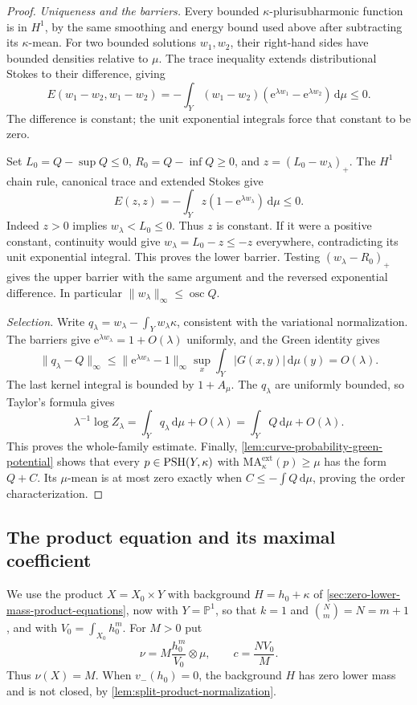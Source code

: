 \begin{proof}
\emph{Uniqueness and the barriers.} Every bounded $\kappa$-plurisubharmonic function is in $H^1$, by the same smoothing and energy bound used above after subtracting its $\kappa$-mean. For two bounded solutions $w_1,w_2$, their right-hand sides have bounded densities relative to $\mu$. The trace inequality extends distributional Stokes to their difference, giving
\[
 E(w_1-w_2,w_1-w_2)
 =-\int_Y(w_1-w_2)(\mathrm e^{\lambda w_1}-\mathrm e^{\lambda w_2})\,\mathrm d\mu\leq0.
\]
The difference is constant; the unit exponential integrals force that constant to be zero.

Set $L_0=Q-\sup Q\leq0$, $R_0=Q-\inf Q\geq0$, and $z=(L_0-w_\lambda)_+$. The $H^1$ chain rule, canonical trace and extended Stokes give
\[
 E(z,z)=-\int_Yz(1-\mathrm e^{\lambda w_\lambda})\,\mathrm d\mu\leq0.
\]
Indeed $z>0$ implies $w_\lambda<L_0\leq0$. Thus $z$ is constant. If it were a positive constant, continuity would give $w_\lambda=L_0-z\leq-z$ everywhere, contradicting its unit exponential integral. This proves the lower barrier. Testing $(w_\lambda-R_0)_+$ gives the upper barrier with the same argument and the reversed exponential difference. In particular $\|w_\lambda\|_\infty\leq\operatorname{osc}Q$.

\emph{Selection.} Write $q_\lambda=w_\lambda-\int_Yw_\lambda\kappa$, consistent with the variational normalization. The barriers give $\mathrm e^{\lambda w_\lambda}=1+O(\lambda)$ uniformly, and the Green identity gives
\[
 \|q_\lambda-Q\|_\infty
 \leq\|\mathrm e^{\lambda w_\lambda}-1\|_\infty
       \sup_x\int_Y|G(x,y)|\,\mathrm d\mu(y)=O(\lambda).
\]
The last kernel integral is bounded by $1+A_\mu$. The $q_\lambda$ are uniformly bounded, so Taylor's formula gives
\[
 \lambda^{-1}\log Z_\lambda
 =\int_Yq_\lambda\,\mathrm d\mu+O(\lambda)
 =\int_YQ\,\mathrm d\mu+O(\lambda).
\]
This proves the whole-family estimate. Finally, \cref{lem:curve-probability-green-potential} shows that every $p\in\mathrm{PSH}(Y,\kappa)$ with $\mathrm{MA}^{\mathrm{ext}}_\kappa(p)\geq\mu$ has the form $Q+C$. Its $\mu$-mean is at most zero exactly when $C\leq-\int Q\,\mathrm d\mu$, proving the order characterization.
\end{proof}

\subsection{The product equation and its maximal coefficient}

We use the product $X=X_0\times Y$ with background $H=h_0+\kappa$ of \cref{sec:zero-lower-mass-product-equations}, now with $Y=\mathbb P^1$, so that $k=1$ and $\binom Nm=N=m+1$, and with $V_0=\int_{X_0}h_0^m$. For $M>0$ put
\[
 \nu=M\frac{h_0^m}{V_0}\otimes\mu,\qquad c=\frac{NV_0}{M}.
\]
Thus $\nu(X)=M$. When $v_-(h_0)=0$, the background $H$ has zero lower mass and is not closed, by \cref{lem:split-product-normalization}.

